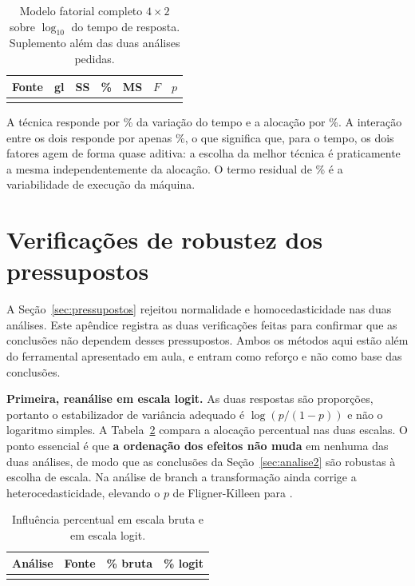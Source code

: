 \documentclass[11pt,a4paper]{article}
\begin{document}
\begin{table}[H]
\centering
\caption{Modelo fatorial completo $4\times2$ sobre $\log_{10}$ do tempo de resposta.
Suplemento além das duas análises pedidas.}
\label{tab:completo}
\small
\begin{tabular}{@{}lrrrrrr@{}}
\toprule
\textbf{Fonte} & \textbf{gl} & \textbf{SS} & \textbf{\%} & \textbf{MS} &
\textbf{$F$} & \textbf{$p$} \\
\midrule
\\
\bottomrule
\end{tabular}
\end{table}

A técnica responde por \valPctTec\% da variação do tempo e a alocação por
\valPctAloc\%. A interação entre os dois responde por apenas \valPctInter\%, o que
significa que, para o tempo, os dois fatores agem de forma quase aditiva: a escolha da
melhor técnica é praticamente a mesma independentemente da alocação. O termo residual de
\valPctResid\% é a variabilidade de execução da máquina.


\section{Verificações de robustez dos pressupostos}
\label{ap:robustez}

A Seção~\ref{sec:pressupostos} rejeitou normalidade e homocedasticidade nas duas
análises. Este apêndice registra as duas verificações feitas para confirmar que as
conclusões não dependem desses pressupostos. Ambos os métodos aqui estão além do
ferramental apresentado em aula, e entram como reforço e não como base das conclusões.

\textbf{Primeira, reanálise em escala logit.} As duas respostas são proporções, portanto o
estabilizador de variância adequado é $\log(p/(1-p))$ e não o logaritmo simples. A
Tabela~\ref{tab:logit} compara a alocação percentual nas duas escalas. O ponto essencial é
que \textbf{a ordenação dos efeitos não muda} em nenhuma das duas análises, de modo que as
conclusões da Seção~\ref{sec:analise2} são robustas à escolha de escala. Na análise de
branch a transformação ainda corrige a heterocedasticidade, elevando o $p$ de
Fligner-Killeen para \valFatDoisFlignerLogitP.

\begin{table}[H]
\centering
\caption{Influência percentual em escala bruta e em escala logit.}
\label{tab:logit}
\small
\begin{tabular}{@{}cl rr@{}}
\toprule
\textbf{Análise} & \textbf{Fonte} & \textbf{\% bruta} & \textbf{\% logit} \\
\midrule
\\
\bottomrule
\end{tabular}
\end{table}
\end{document}
